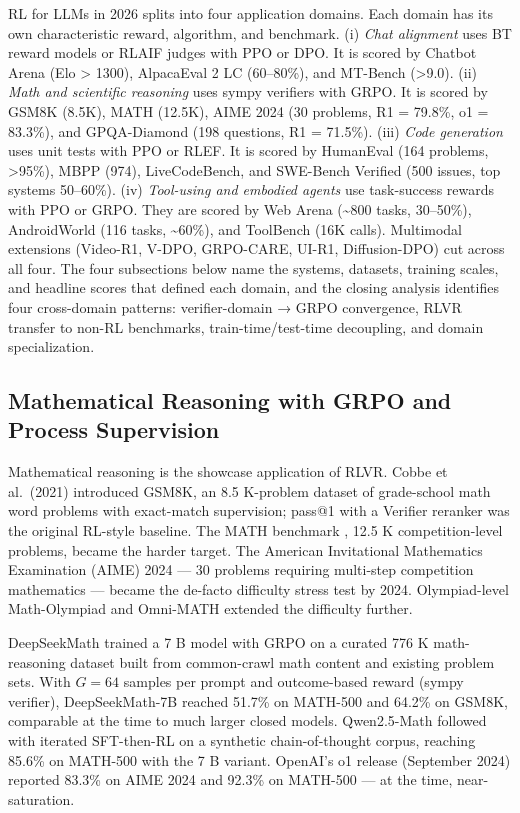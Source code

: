 \documentclass{article}
\begin{document}
RL for LLMs in 2026 splits into four application domains. Each domain has its own characteristic reward, algorithm, and benchmark. (i) \emph{Chat alignment} uses BT reward models or RLAIF judges with PPO or DPO. It is scored by Chatbot Arena (Elo \textgreater{} 1300), AlpacaEval 2 LC (60--80\%), and MT-Bench (\textgreater9.0). (ii) \emph{Math and scientific reasoning} uses sympy verifiers with GRPO. It is scored by GSM8K (8.5K), MATH (12.5K), AIME 2024 (30 problems, R1 = 79.8\%, o1 = 83.3\%), and GPQA-Diamond (198 questions, R1 = 71.5\%). (iii) \emph{Code generation} uses unit tests with PPO or RLEF. It is scored by HumanEval (164 problems, \textgreater95\%), MBPP (974), LiveCodeBench, and SWE-Bench Verified (500 issues, top systems 50--60\%). (iv) \emph{Tool-using and embodied agents} use task-success rewards with PPO or GRPO. They are scored by Web Arena (\textasciitilde800 tasks, 30--50\%), AndroidWorld (116 tasks, \textasciitilde60\%), and ToolBench (16K calls). Multimodal extensions (Video-R1, V-DPO, GRPO-CARE, UI-R1, Diffusion-DPO) cut across all four. The four subsections below name the systems, datasets, training scales, and headline scores that defined each domain, and the closing analysis identifies four cross-domain patterns: verifier-domain → GRPO convergence, RLVR transfer to non-RL benchmarks, train-time/test-time decoupling, and domain specialization.

\subsection{Mathematical Reasoning with GRPO and Process Supervision}\label{mathematical-reasoning-with-grpo-and-process-supervision}

Mathematical reasoning is the showcase application of RLVR. Cobbe et al.~(2021) introduced GSM8K, an 8.5 K-problem dataset of grade-school math word problems with exact-match supervision; pass@1 with a Verifier reranker was the original RL-style baseline. The MATH benchmark \citep{hendrycks2021measuringmathemati}, 12.5 K competition-level problems, became the harder target. The American Invitational Mathematics Examination (AIME) 2024 --- 30 problems requiring multi-step competition mathematics --- became the de-facto difficulty stress test by 2024. Olympiad-level Math-Olympiad \citep{liu20232023} and Omni-MATH \citep{gao2023scalinglawsforrewa} extended the difficulty further.

DeepSeekMath \citep{shao20242024} trained a 7 B model with GRPO on a curated 776 K math-reasoning dataset built from common-crawl math content and existing problem sets. With \(G = 64\) samples per prompt and outcome-based reward (sympy verifier), DeepSeekMath-7B reached 51.7\% on MATH-500 and 64.2\% on GSM8K, comparable at the time to much larger closed models. Qwen2.5-Math \citep{an20242024} followed with iterated SFT-then-RL on a synthetic chain-of-thought corpus, reaching 85.6\% on MATH-500 with the 7 B variant. OpenAI's o1 release (September 2024) reported 83.3\% on AIME 2024 and 92.3\% on MATH-500 --- at the time, near-saturation.
\end{document}
